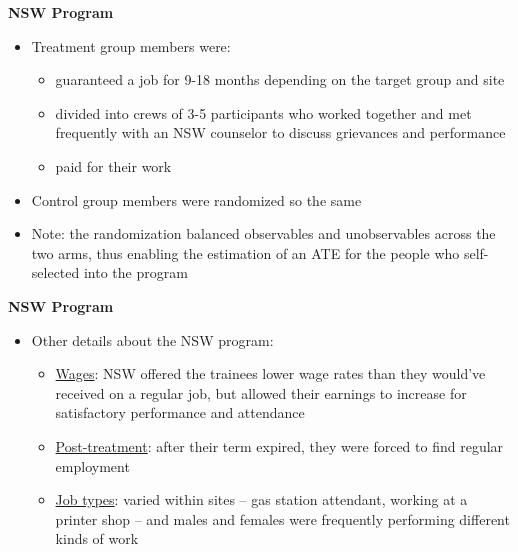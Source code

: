 \documentclass[notes=show]{beamer}
\begin{document}
\begin{frame}[plain]
	\begin{center}
	\textbf{NSW Program}
	\end{center}
	
	\begin{itemize}
	\item Treatment group members were:
		\begin{itemize}
		\item guaranteed a job for 9-18 months depending on the target group and site
		\item divided into crews of 3-5 participants who worked together and met frequently with an NSW counselor to discuss grievances and performance
		\item paid for their work
		\end{itemize}
	\item Control group members were randomized so the same
	\item Note: the randomization balanced observables and unobservables across the two arms, thus enabling the estimation of an ATE for the people who self-selected into the program
	\end{itemize}
\end{frame}

\begin{frame}[plain]
\begin{center}
\textbf{NSW Program}
\end{center}

\begin{itemize}
	\item Other details about the NSW program:
		\begin{itemize}
		\item \underline{Wages}:  NSW offered the trainees lower wage rates than they would've received on a regular job, but allowed their earnings to increase for satisfactory performance and attendance
		\item \underline{Post-treatment}: after their term expired, they were forced to find regular employment
		\item \underline{Job types}:  varied within sites -- gas station attendant, working at a printer shop -- and males and females were frequently performing different kinds of work
		\end{itemize}
\end{itemize}

\end{frame}
	
\end{document}
